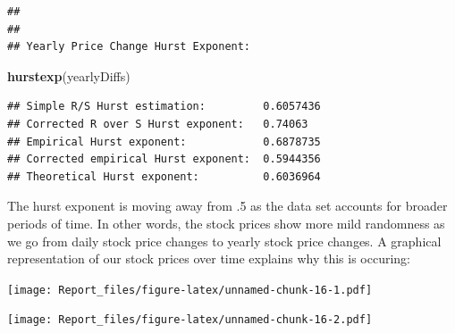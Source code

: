 \documentclass[]{article}
\newenvironment{Shaded}{\begin{snugshade}}{\end{snugshade}}
\newcommand{\DataTypeTok}[1]{\textcolor[rgb]{0.13,0.29,0.53}{#1}}
\newcommand{\KeywordTok}[1]{\textcolor[rgb]{0.13,0.29,0.53}{\textbf{#1}}}
\newcommand{\NormalTok}[1]{#1}
\newcommand{\OperatorTok}[1]{\textcolor[rgb]{0.81,0.36,0.00}{\textbf{#1}}}
\newcommand{\StringTok}[1]{\textcolor[rgb]{0.31,0.60,0.02}{#1}}
\begin{document}
\begin{verbatim}
## 
## 
## Yearly Price Change Hurst Exponent:
\end{verbatim}

\begin{Shaded}
\begin{Highlighting}[]
\KeywordTok{hurstexp}\NormalTok{(yearlyDiffs)}
\end{Highlighting}
\end{Shaded}

\begin{verbatim}
## Simple R/S Hurst estimation:         0.6057436 
## Corrected R over S Hurst exponent:   0.74063 
## Empirical Hurst exponent:            0.6878735 
## Corrected empirical Hurst exponent:  0.5944356 
## Theoretical Hurst exponent:          0.6036964
\end{verbatim}

The hurst exponent is moving away from .5 as the data set accounts for
broader periods of time. In other words, the stock prices show more mild
randomness as we go from daily stock price changes to yearly stock price
changes. A graphical representation of our stock prices over time
explains why this is occuring:

\begin{Shaded}
\end{Shaded}

\texttt{[image: Report\_files/figure-latex/unnamed-chunk-16-1.pdf]}

\begin{Shaded}
\end{Shaded}

\texttt{[image: Report\_files/figure-latex/unnamed-chunk-16-2.pdf]}
\end{document}
